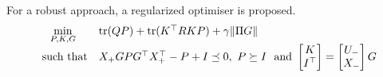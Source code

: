 For a robust approach, a regularized optimiser is proposed.
\begin{equation}\label{eq:prob_reg1}
\begin{array}{cl}
 \displaystyle{\min_{P,K,G}} & \trace(QP)+\trace(K^\top RKP)+\gamma\|\Pi G\|\\
 \text{ such that} & X_+GPG^\top X_+^\top -P+I\preceq 0,\ P \succeq I\ \text{ and } \bbm K\\ I^\top\ebm=\bbm U_-\\X_-\ebm G\\
\end{array}
\end{equation}
